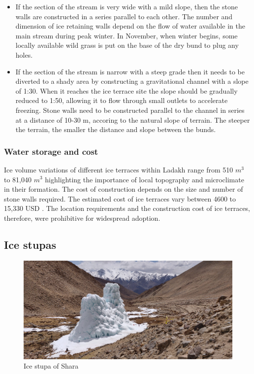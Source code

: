 \begin{itemize}

  \item If the section of the stream is very wide with a mild slope, then the stone walls are
    constructed in a series parallel to each other. The number and dimension of ice retaining walls depend on
    the flow of water available in the main stream during peak winter. In November, when winter begins, some
    locally available wild grass is put on the base of the dry bund to plug any holes.

  \item If the section of the stream is narrow with a steep grade then it needs to be diverted to a shady area
    by constructing a gravitational channel with a slope of 1:30. When it reaches the ice terrace site the slope
    should be gradually reduced to 1:50, allowing it to flow through small outlets to accelerate freezing. Stone
    walls need to be constructed parallel to the channel in series at a distance of 10-30 m, accoring to the
    natural slope of terrain. The steeper the terrain, the smaller the distance and slope between the bunds.

\end{itemize}


\subsubsection{Water storage and cost}

Ice volume variations of different ice terraces within Ladakh  range from 510 $m^3$ to 81,040 $m^3$
\citep{nusserSociohydrologyArtificialGlaciers2019, norphelSnowWaterHarvesting2015} highlighting the importance
of local topography and microclimate in their formation. The cost of construction depends on the size and number
of stone walls required. The estimated cost of ice terraces vary between 4600 to 15,330 USD
\cite{nusserSociohydrologyArtificialGlaciers2019}. The location requirements and the construction cost of ice
terraces, therefore, were prohibitive for widespread adoption.

\subsection{Ice stupas}

\begin{figure}[htb]
\centering
\includegraphics[width=12cm]{figs/IS_example.jpg}
\caption{Ice stupa of Shara}
\label{fig:ISexample}
\end{figure}

